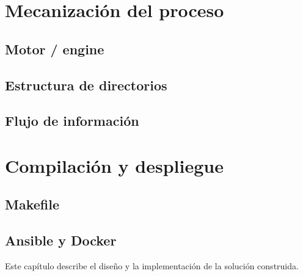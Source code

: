 \section{Mecanización del proceso}
\subsection{Motor / engine}
\subsection{Estructura de directorios}
\subsection{Flujo de información}

\section{Compilación y despliegue}
\subsection{Makefile}
\subsection{Ansible y Docker}


Este capítulo describe el diseño y la implementación de la solución construida.


